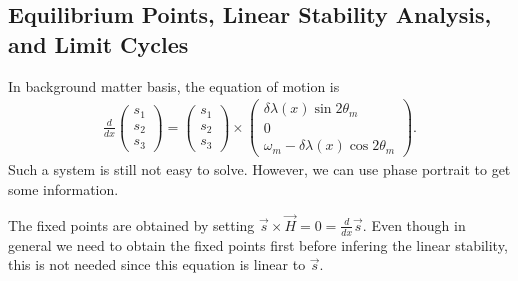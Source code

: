 \documentclass[letterpaper,12pt,english]{sphinxmanual}
\begin{document}
\subsection{Equilibrium Points, Linear Stability Analysis, and Limit Cycles}
\label{\detokenize{matter-stimulated/flavor-isospin-matter:equilibrium-points-linear-stability-analysis-and-limit-cycles}}
In background matter basis, the equation of motion is
\begin{equation*}
\begin{split}\frac{d}{dx}\begin{pmatrix}
s_1 \\
s_2 \\
s_3
\end{pmatrix} = \begin{pmatrix}
s_1 \\
s_2 \\
s_3
\end{pmatrix}  \times \begin{pmatrix}
\delta \lambda(x) \sin 2\theta_m \\
0 \\
\omega_m - \delta \lambda(x) \cos 2\theta_m
\end{pmatrix}.\end{split}
\end{equation*}
Such a system is still not easy to solve. However, we can use phase portrait to get some information.

The fixed points are obtained by setting \(\vec s\times \vec H = 0 = \frac{d}{dx}\vec s\). Even though in general we need to obtain the fixed points first before infering the linear stability, this is not needed since this equation is linear to \(\vec s\).
\end{document}
